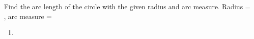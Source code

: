 Find the arc length of the circle with the given radius and arc measure.
\newline
Radius = , arc measure = \degree
\newline
\begin{enumerate}
    \item
    \degree
{}
\end{enumerate}


